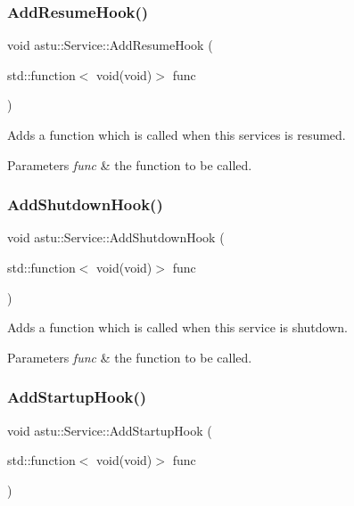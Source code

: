 \subsubsection{\texorpdfstring{Add\+Resume\+Hook()}{AddResumeHook()}}
{\footnotesize\ttfamily void astu\+::\+Service\+::\+Add\+Resume\+Hook (\begin{DoxyParamCaption}\item[{std\+::function$<$ void(void)$>$}]{func }\end{DoxyParamCaption})}

Adds a function which is called when this services is resumed.


\begin{DoxyParams}{Parameters}
{\em func} & the function to be called. \\
\hline
\end{DoxyParams}
\mbox{\label{classastu_1_1Service_afd15c531e0298f898192f4a1cdfa2a2d}} 
\subsubsection{\texorpdfstring{Add\+Shutdown\+Hook()}{AddShutdownHook()}}
{\footnotesize\ttfamily void astu\+::\+Service\+::\+Add\+Shutdown\+Hook (\begin{DoxyParamCaption}\item[{std\+::function$<$ void(void)$>$}]{func }\end{DoxyParamCaption})}

Adds a function which is called when this service is shutdown.


\begin{DoxyParams}{Parameters}
{\em func} & the function to be called. \\
\hline
\end{DoxyParams}
\mbox{\label{classastu_1_1Service_a8a4a5e418992839d78a2062ad9ecb288}} 
\subsubsection{\texorpdfstring{Add\+Startup\+Hook()}{AddStartupHook()}}
{\footnotesize\ttfamily void astu\+::\+Service\+::\+Add\+Startup\+Hook (\begin{DoxyParamCaption}\item[{std\+::function$<$ void(void)$>$}]{func }\end{DoxyParamCaption})}

